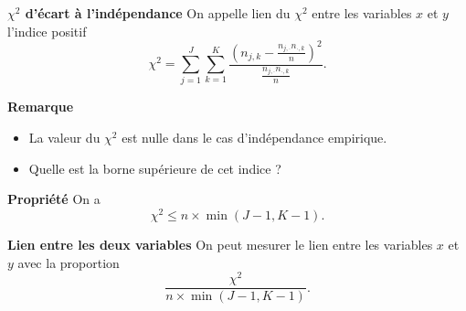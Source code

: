 \documentclass[aspectratio=169,xcolor=dvipsnames]{beamer}
\begin{document}
\begin{frame}
	\begin{block}{\textbf{$\chi^2$ d'écart à l'indépendance}}
	On appelle lien du $\chi^2$ entre les variables $x$ et $y$ l'indice positif
		\[
		\chi^2 = \sum_{j=1}^J \sum_{k=1}^K \dfrac{\left(n_{j,k} - \frac{n_{j,\cdot}n_{\cdot,k}}{n} \right)^2}{\frac{n_{j,\cdot}n_{\cdot,k}}{n}}.
		\]
	\end{block}
	
	\begin{exampleblock}{\textbf{Remarque}}
		\begin{itemize}
		\item La valeur du $\chi^2$ est nulle dans le cas d'indépendance empirique.
		\item Quelle est la borne supérieure de cet indice ?
		\end{itemize}
	\end{exampleblock}
\end{frame}

\begin{frame}
	\begin{alertblock}{\textbf{Propriété}}
	On a 
		\[
		\chi^2 \leqslant n \times \min \left( J-1,K-1 \right).
		\]
	\end{alertblock}
	
	\vfill
	
	\begin{block}{\textbf{Lien entre les deux variables}}
	On peut mesurer le lien entre les variables $x$ et $y$ avec la proportion
	\[\dfrac{\chi^2}{n\times \min (J-1,K-1)}.\]
	\end{block}
\end{frame}
\end{document}
